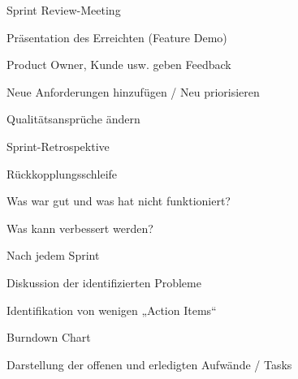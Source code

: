 \documentclass[a4paper]{article}
\begin{document}
\begin{multicols}{3}

  Sprint Review-Meeting
  \begin{itemize*}
    \item Präsentation des Erreichten (Feature Demo)
    \item Product Owner, Kunde usw. geben Feedback
    \begin{itemize*}
      \item Neue Anforderungen hinzufügen / Neu priorisieren
      \item Qualitätsansprüche ändern
    \end{itemize*}
  \end{itemize*}

  Sprint-Retrospektive
  \begin{itemize*}
    \item Rückkopplungsschleife
    \begin{itemize*}
      \item Was war gut und was hat nicht funktioniert?
      \item Was kann verbessert werden?
    \end{itemize*}
    \item Nach jedem Sprint
    \item Diskussion der identifizierten Probleme
    \item Identifikation von wenigen „Action Items“
  \end{itemize*}

  Burndown Chart
  \begin{itemize*}
    \item Darstellung der offenen und erledigten Aufwände / Tasks
  \end{itemize*}


\end{multicols}
\end{document}
